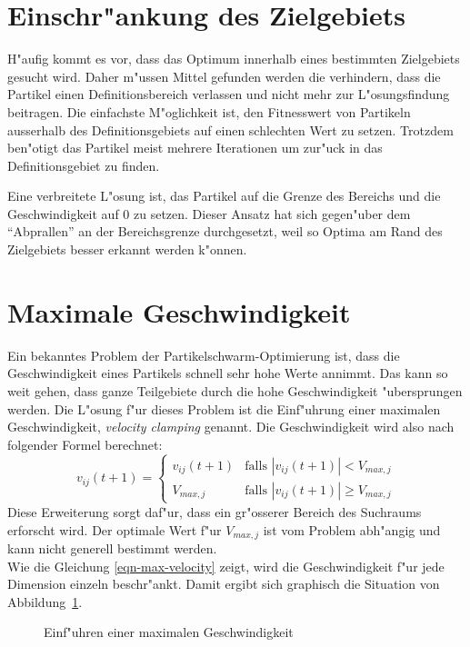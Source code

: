 \section{Einschr"ankung des Zielgebiets}
H"aufig kommt es vor, dass das Optimum innerhalb eines bestimmten
Zielgebiets gesucht wird. Daher m"ussen Mittel gefunden werden die
verhindern, dass die Partikel einen Definitionsbereich verlassen und
nicht mehr zur L"osungsfindung beitragen. Die einfachste M"oglichkeit
ist, den Fitnesswert von Partikeln ausserhalb des Definitionsgebiets auf
einen schlechten Wert zu setzen. Trotzdem ben"otigt das Partikel meist
mehrere Iterationen um zur"uck in das Definitionsgebiet zu finden.

Eine verbreitete L"osung ist, das Partikel auf die Grenze des Bereichs und
die Geschwindigkeit auf 0 zu setzen. Dieser Ansatz hat sich gegen"uber
dem ``Abprallen'' an der Bereichsgrenze durchgesetzt, weil so Optima am
Rand des Zielgebiets besser erkannt werden k"onnen.

\section{Maximale Geschwindigkeit}
Ein bekanntes Problem der Partikelschwarm-Optimierung ist, dass die
Geschwindigkeit eines Partikels schnell sehr hohe Werte annimmt. Das
kann so weit gehen, dass ganze Teilgebiete durch die hohe Geschwindigkeit
"ubersprungen werden. Die L"osung f"ur dieses Problem ist die Einf"uhrung
einer maximalen Geschwindigkeit, \textit{velocity clamping} genannt. Die
Geschwindigkeit wird also nach folgender Formel berechnet:
\begin{equation}
	v_{ij}(t+1) = 
	\begin{cases}
		v_{ij}(t+1) & \text{falls $|v_{ij}(t+1)| < V_{max,j}$}\\
		V_{max,j} & \text{falls $|v_{ij}(t+1)| \geq V_{max,j}$}
	\end{cases}
	\label{eqn-max-velocity}
\end{equation}
Diese Erweiterung sorgt daf"ur, dass ein gr"osserer Bereich des Suchraums
erforscht wird. Der optimale Wert f"ur $V_{max,j}$ ist vom Problem
abh"angig und kann nicht generell bestimmt werden. \\

Wie die Gleichung \ref{eqn-max-velocity} zeigt, wird die Geschwindigkeit
f"ur jede Dimension einzeln beschr"ankt. Damit ergibt sich graphisch
die Situation von Abbildung~\ref{fig-max-velocity}.

\begin{figure}[htbp]
	\centering
	
	\caption{Einf"uhren einer maximalen Geschwindigkeit}
	\label{fig-max-velocity}
\end{figure}

